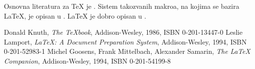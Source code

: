 \documentclass{article}
\begin{document}
Osnovna literatura za \TeX{} je \cite{knut86}. Sistem takozvanih
makroa, na kojima se bazira \LaTeX{}, je opisan u \cite[poglavlje
20]{knut86}. \LaTeX{} je dobro opisan u \cite{lamp94, goos94}.
\begin{thebibliography}{9}
 Donald Knuth, {\em The \TeX{}book},
Addison-Wesley, 1986, ISBN 0-201-13447-0
 Leslie Lamport, {\em \LaTeX{}: A Document
Preparation System}, Addison-Wesley, 1994, ISBN 0-201-52983-1
 Michel Goosens, Frank Mittelbach, Alexander
Samarin, {\em The \LaTeX{} Companion}, Addison-Wesley, 1994,
ISBN 0-201-54199-8
\end{thebibliography}
\end{document}
